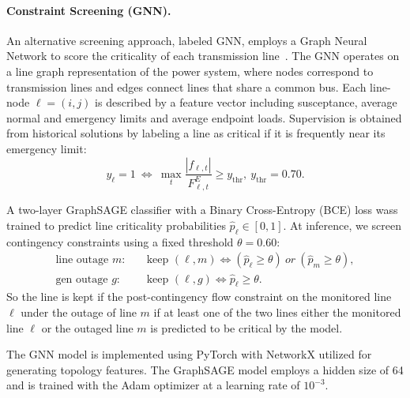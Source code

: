 \documentclass{ieeeaccess}
\begin{document}
\paragraph{Constraint Screening (GNN).}

An alternative screening approach, labeled GNN, employs a Graph Neural Network to score the criticality of each transmission line~\cite{Nakiganda2023}. The GNN operates on a line graph representation of the power system, where nodes correspond to transmission lines and edges connect lines that share a common bus. Each line-node $\ell=(i,j)$ is described by a feature vector including susceptance, average normal and emergency limits and average endpoint loads.
Supervision is obtained from historical solutions by labeling a line as critical if it is frequently near its
emergency limit:
\begin{equation}
y_\ell= 1\ \iff\ \max_t \frac{|f_{\ell,t}|}{F^E_{\ell,t}} \ge y_{\mathrm{thr}},\ y_{\mathrm{thr}}=0.70.
\end{equation}

A two-layer GraphSAGE classifier with a Binary Cross-Entropy (BCE) loss wass trained to predict line criticality probabilities
$\hat p_\ell\in[0,1]$.
At inference, we screen contingency constraints using a fixed threshold $\theta=0.60$:
\begin{align}
\text{line outage } m:\quad &\text{keep }(\ell,m)\iff (\hat p_\ell\ge\theta)\ or\ (\hat p_m\ge\theta),\\
\text{gen outage } g:\quad  &\text{keep }(\ell,g)\iff \hat p_\ell\ge\theta.
\end{align}
So the line is kept if the post-contingency flow constraint on the monitored line $\ell$ under the outage of line $m$ if at least one of the two lines either the monitored line $\ell$ or the outaged line $m$ is predicted to be critical by the model.

The GNN model is implemented using PyTorch with NetworkX utilized for generating topology features. The GraphSAGE model employs a hidden size of 64 and is trained with the Adam optimizer at a learning rate of $10^{-3}$.
\end{document}
